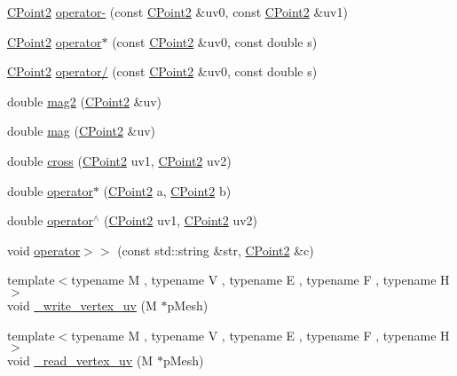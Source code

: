 \begin{DoxyCompactItemize}
\item 
\hyperlink{class_mesh_lib_1_1_c_point2}{C\+Point2} \hyperlink{namespace_mesh_lib_a40e50ff27b1a51bfb49fffee095133a4}{operator-\/} (const \hyperlink{class_mesh_lib_1_1_c_point2}{C\+Point2} \&uv0, const \hyperlink{class_mesh_lib_1_1_c_point2}{C\+Point2} \&uv1)
\item 
\hyperlink{class_mesh_lib_1_1_c_point2}{C\+Point2} \hyperlink{namespace_mesh_lib_a8d5edb06e9ddc9bcd3b978853603f9be}{operator$\ast$} (const \hyperlink{class_mesh_lib_1_1_c_point2}{C\+Point2} \&uv0, const double s)
\item 
\hyperlink{class_mesh_lib_1_1_c_point2}{C\+Point2} \hyperlink{namespace_mesh_lib_a0bb356861876e4732adba54c4b4f1816}{operator/} (const \hyperlink{class_mesh_lib_1_1_c_point2}{C\+Point2} \&uv0, const double s)
\item 
double \hyperlink{namespace_mesh_lib_af2c139d9c9d6112e8e72508d7e5c6bcf}{mag2} (\hyperlink{class_mesh_lib_1_1_c_point2}{C\+Point2} \&uv)
\item 
double \hyperlink{namespace_mesh_lib_afc6768df7d6cacb0068fd7f24038b154}{mag} (\hyperlink{class_mesh_lib_1_1_c_point2}{C\+Point2} \&uv)
\item 
double \hyperlink{namespace_mesh_lib_a2ade6b60ae078fba88d883854f653f84}{cross} (\hyperlink{class_mesh_lib_1_1_c_point2}{C\+Point2} uv1, \hyperlink{class_mesh_lib_1_1_c_point2}{C\+Point2} uv2)
\item 
double \hyperlink{namespace_mesh_lib_aebfbcaa5edd6ab9a3ff4cea0946932b7}{operator$\ast$} (\hyperlink{class_mesh_lib_1_1_c_point2}{C\+Point2} a, \hyperlink{class_mesh_lib_1_1_c_point2}{C\+Point2} b)
\item 
double \hyperlink{namespace_mesh_lib_ab10449a08569b7043e65ddd4b02fce35}{operator$^\wedge$} (\hyperlink{class_mesh_lib_1_1_c_point2}{C\+Point2} uv1, \hyperlink{class_mesh_lib_1_1_c_point2}{C\+Point2} uv2)
\item 
void \hyperlink{namespace_mesh_lib_a60590be9181e047574356d660f294629}{operator$>$$>$} (const std\+::string \&str, \hyperlink{class_mesh_lib_1_1_c_point2}{C\+Point2} \&c)
\item 
{\footnotesize template$<$typename M , typename V , typename E , typename F , typename H $>$ }\\void \hyperlink{namespace_mesh_lib_a92dbd8987379bb2330d0e1dd88541cef}{\+\_\+write\+\_\+vertex\+\_\+uv} (M $\ast$p\+Mesh)
\item 
{\footnotesize template$<$typename M , typename V , typename E , typename F , typename H $>$ }\\void \hyperlink{namespace_mesh_lib_a56e0c746d2f0831f190276f351973eed}{\+\_\+read\+\_\+vertex\+\_\+uv} (M $\ast$p\+Mesh)

\end{DoxyCompactItemize}
